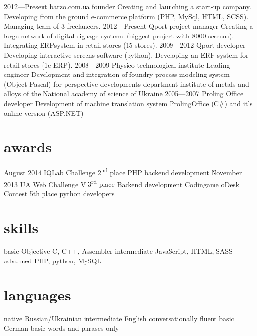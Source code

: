 \documentclass[hidelinks,a4paper]{cv}
\begin{document}
\begin{entrylist}
  \entry
    {2012—Present}
    {barzo.com.ua}
    {founder}
    {Creating and launching a start-up company. Developing from the ground e-commerce platform (PHP, MySql, HTML, SCSS). Managing team of 3 freelancers.
    }
  \entry
    {2012—Present}
    {Qport}
    {project manager}
    {
    Creating a large network of digital signage systems (biggest project with 8000 screens).
    Integrating ERPsystem in retail stores (15 stores).
    }
  \entry
    {2009—2012}
    {Qport}
    {developer}
    {
    Developing interactive screens software (python). 
    Developing an ERP system for retail stores (1c ERP).
    }
  \entry
    {2008—2009} 
    {Physico-technological institute}
    {Leading engineer}
    {Development and integration of foundry process modeling system (Object Pascal) for perspective developments department institute of metals and alloys of the National academy of science of Ukraine}
  \entry
    {2005—2007}
    {Proling Office}
    {developer}
    {Development of machine translation system ProlingOffice (C\#) and it's online version (ASP.NET)}
\end{entrylist}

\section{awards}

\begin{entrylist}
  \entry
   {August 2014}
   {IQLab Challenge}
   {2\textsuperscript{nd} place}
   {PHP backend development}
  \entry  
   {November 2013}
   {\href{http://uawebchallenge.com/news/v-final-results}{UA Web Challenge V}}
   {3\textsuperscript{rd} place}
   {Backend development}
  \entry  
   {}
   {Codingame oDesk Contest}
   {5th place}
   {python developers }
\end{entrylist}

\newpage{}

\section{skills}
\begin{entrylist}
  \entry
   {basic}
   {Objective-C, C++, Assembler}
   {}
   {}
  \entry
   {intermediate}
   {JavaScript, HTML, SASS}
   {}
   {}
  \entry
   {advanced}
   {PHP, python, MySQL}
   {}
   {}
\end{entrylist}

\section{languages}
\begin{entrylist}
  \entry
   {native}
   {Russian/Ukrainian}
   {}
   {}
  \entry
   {intermediate}
   {English}
   {conversationally fluent}
   {}
  \entry
   {basic}
   {German}
   {basic words and phrases only}
   {}
\end{entrylist}
\end{document}
